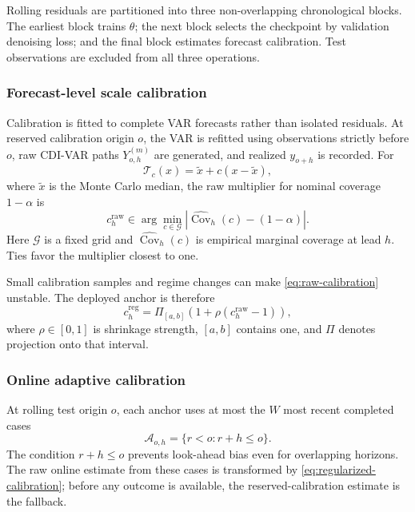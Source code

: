 \documentclass[11pt]{article}
\begin{document}
Rolling residuals are partitioned into three non-overlapping chronological blocks. The earliest block trains $\theta$; the next block selects the checkpoint by validation denoising loss; and the final block estimates forecast calibration. Test observations are excluded from all three operations.

\subsubsection{Forecast-level scale calibration}

Calibration is fitted to complete VAR forecasts rather than isolated residuals. At reserved calibration origin $o$, the VAR is refitted using observations strictly before $o$, raw CDI-VAR paths $Y_{o,h}^{(m)}$ are generated, and realized $y_{o+h}$ is recorded. For
\begin{equation}
    \mathcal T_c(x)=\widetilde x+c(x-\widetilde x),
    \label{eq:scale-transform}
\end{equation}
where $\widetilde x$ is the Monte Carlo median, the raw multiplier for nominal coverage $1-\alpha$ is
\begin{equation}
    c_h^{\mathrm{raw}}
    \in\arg\min_{c\in\mathcal G}
    \left|\widehat{\operatorname{Cov}}_h(c)-(1-\alpha)\right|.
    \label{eq:raw-calibration}
\end{equation}
Here $\mathcal G$ is a fixed grid and $\widehat{\operatorname{Cov}}_h(c)$ is empirical marginal coverage at lead $h$. Ties favor the multiplier closest to one.

Small calibration samples and regime changes can make \eqref{eq:raw-calibration} unstable. The deployed anchor is therefore
\begin{equation}
    c_h^{\mathrm{reg}}
    =\Pi_{[a,b]}\left(1+\rho(c_h^{\mathrm{raw}}-1)\right),
    \label{eq:regularized-calibration}
\end{equation}
where $\rho\in[0,1]$ is shrinkage strength, $[a,b]$ contains one, and $\Pi$ denotes projection onto that interval.

\subsubsection{Online adaptive calibration}

At rolling test origin $o$, each anchor uses at most the $W$ most recent completed cases
\begin{equation}
    \mathcal A_{o,h}=\{r<o:r+h\leq o\}.
    \label{eq:available-cases}
\end{equation}
The condition $r+h\leq o$ prevents look-ahead bias even for overlapping horizons. The raw online estimate from these cases is transformed by \eqref{eq:regularized-calibration}; before any outcome is available, the reserved-calibration estimate is the fallback.
\end{document}

